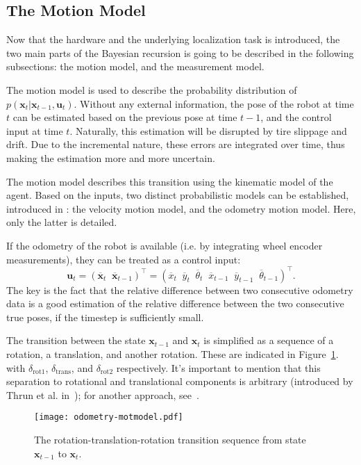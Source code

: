 \subsection{The Motion Model}\label{subsec:mot-model}
Now that the hardware and the underlying localization task is introduced, the two main parts of the
Bayesian recursion is going to be described in the following subsections: the motion model, and the measurement model.

The motion model is used to describe the probability distribution of
$p(\mathbf{x}_t | \mathbf{x}_{t-1},\mathbf{u}_t)$. \linebreak
Without any external information, the pose of the robot at time $t$ can be estimated based on the previous pose
at time $t-1$, and the control input at time $t$. Naturally, this estimation will be disrupted by tire slippage and drift.
Due to the incremental nature, these errors are integrated over time, thus making the estimation more and more
uncertain.

The motion model describes this transition using the kinematic model of the agent.
Based on the inputs, two distinct probabilistic models can be established, introduced in \cite{Thrun2005}: the velocity motion model,
and the odometry motion model. Here, only the latter is detailed.

If the odometry of the robot is available (i.e. by integrating wheel encoder measurements),
they can be treated as a control input:
\begin{equation}
    \mathbf{u}_t = (\overline{\mathbf{x}}_t\;\;\overline{\mathbf{x}}_{t-1})^\top =
    \left(\overline{x}_t\;\;\overline{y}_t\;\;\overline{\theta}_t\;\;\overline{x}_{t-1}\;\;\overline{y}_{t-1}\;\;\overline{\theta}_{t-1}\right)^\top.
\end{equation}
The key is the fact that the relative difference between
two consecutive odometry data is a good estimation of the relative difference between
the two consecutive true poses, if the timestep is sufficiently small.

The transition between the state $\mathbf{x}_{t-1}$ and $\mathbf{x}_{t}$ is simplified as a sequence of a rotation, a translation,
and another rotation.
These are indicated in Figure~\ref{fig:odom-mot-model}. with $\delta_{\mathrm{rot1}}$, $\delta_{\mathrm{trans}}$,
and $\delta_{\mathrm{rot2}}$ respectively.
It's important to mention that this separation to rotational and translational components is arbitrary
(introduced by Thrun et al. in~\cite{Thrun2005}); for another approach, see~\cite{Eliazar2004}.
\begin{figure}[htbp]
    \centering
    \texttt{[image: odometry-motmodel.pdf]}
    \caption{The rotation-translation-rotation transition sequence from state $\mathbf{x}_{t-1}$ to $\mathbf{x}_{t}$.}
    \label{fig:odom-mot-model}
\end{figure}

